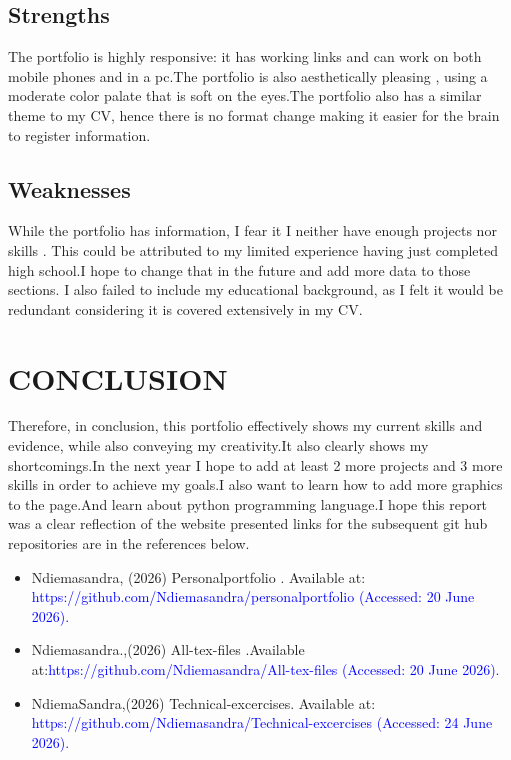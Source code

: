 \documentclass[12pt]{article}
\begin{document}
\subsection{Strengths}
The portfolio is highly responsive: it has working links and can work on both mobile phones and in a pc.The portfolio is also aesthetically pleasing , using a moderate color palate that is soft on the eyes.The portfolio also has a similar theme to my CV, hence there is no format change making it easier for the brain to register information.
\subsection{Weaknesses}
While the portfolio has information, I fear it I neither have enough projects nor skills . This could be attributed to my limited experience having just completed high school.I hope to change that in the  future and add more data to those sections.
I also failed to include my educational background, as I felt it would be redundant considering it is covered extensively in my CV.
\section{CONCLUSION}
Therefore, in conclusion, this portfolio effectively shows my current skills and evidence, while also conveying my creativity.It also clearly shows my shortcomings.In the next year I hope to add at least 2 more projects and 3 more skills in order to  achieve my goals.I also want to learn how to add more graphics to the page.And learn about python programming language.I hope this report was a clear reflection of the website presented links for the subsequent git hub repositories are in the references below.






  
\begin{itemize}
    \item Ndiemasandra, (2026) Personalportfolio . Available at: \textcolor{blue}{https://github.com/Ndiemasandra/personalportfolio (Accessed: 20 June 2026).}
    \item Ndiemasandra.,(2026) All-tex-files .Available at:\textcolor{blue}{https://github.com/Ndiemasandra/All-tex-files (Accessed: 20 June 2026).}
    \item NdiemaSandra,(2026) Technical-excercises. Available at: \textcolor{blue}{https://github.com/Ndiemasandra/Technical-excercises (Accessed: 24 June 2026).}
\end{itemize}%
\end{document}
